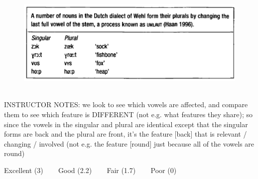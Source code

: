 \documentclass[12pt]{article}
\begin{document}
\begin{figure}[H]
\includegraphics{../images/dutch.png}
\end{figure}

~\\
INSTRUCTOR NOTES: we look to see which vowels are affected, and compare them to see which feature is DIFFERENT (not e.g. what features they share); so since the vowels in the singular and plural are identical except that the singular forms are back and the plural are front, it's the feature [back] that is relevant / changing / involved (not e.g. the feature [round] just because all of the vowels are round)


\vfill
Excellent (3) ~~~ Good (2.2) ~~~ Fair (1.7) ~~~ Poor (0)
\newpage

\begin{center}
\textbf{{\color{red}{\HUGE END OF EXAM}}}\\

\end{center}
\newpage
\end{document}

